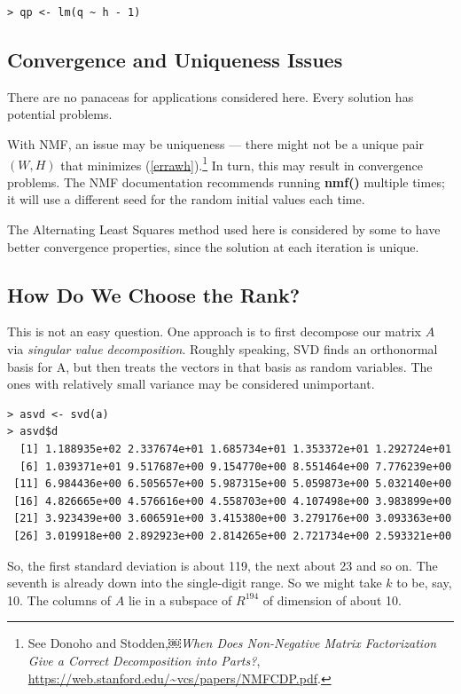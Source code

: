 \begin{lstlisting}
> qp <- lm(q ~ h - 1)
\end{lstlisting}

\subsection{Convergence and Uniqueness Issues}

There are no panaceas for applications considered here.  Every solution
has potential problems.

With NMF, an issue may be uniqueness --- there might not be a unique
pair $(W,H)$ that minimizes (\ref{errawh}).\footnote{See Donoho and
Stodden,￼{\it When Does Non-Negative Matrix Factorization Give a Correct
Decomposition into Parts?},
\url{https://web.stanford.edu/~vcs/papers/NMFCDP.pdf}.  } In turn, this
may result in convergence problems. The NMF documentation recommends
running {\bf nmf()} multiple times; it will use a different seed for the
random initial values each time.

The Alternating Least Squares method used here is considered by some to
have better convergence properties, since the solution at each iteration
is unique.  

\subsection{How Do We Choose the Rank?}

This is not an easy question.  One approach is to first decompose our
matrix $A$ via {\it singular value decomposition}.  Roughly speaking,
SVD finds an orthonormal basis for A, but then treats the vectors in
that basis as random variables.  The ones with relatively small variance
may be considered unimportant.

\begin{lstlisting}
> asvd <- svd(a)
> asvd$d
  [1] 1.188935e+02 2.337674e+01 1.685734e+01 1.353372e+01 1.292724e+01
  [6] 1.039371e+01 9.517687e+00 9.154770e+00 8.551464e+00 7.776239e+00
 [11] 6.984436e+00 6.505657e+00 5.987315e+00 5.059873e+00 5.032140e+00
 [16] 4.826665e+00 4.576616e+00 4.558703e+00 4.107498e+00 3.983899e+00
 [21] 3.923439e+00 3.606591e+00 3.415380e+00 3.279176e+00 3.093363e+00
 [26] 3.019918e+00 2.892923e+00 2.814265e+00 2.721734e+00 2.593321e+00
\end{lstlisting}

So, the first standard deviation is about 119, the next about 23 and so
on.  The seventh is already down into the single-digit range.  So we
might take $k$ to be, say, 10.  The columns of $A$ lie in a subspace of
$R^{194}$ of dimension of about 10.

